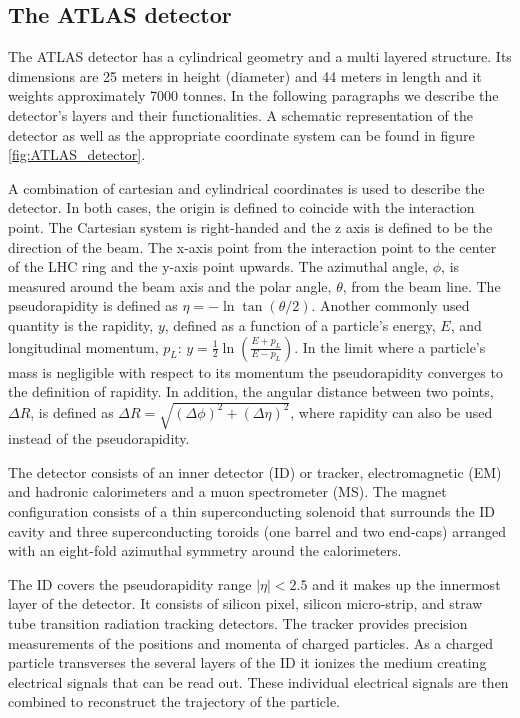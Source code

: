 \subsection{The ATLAS detector}
\label{section:ATLAS}

The ATLAS detector has a cylindrical geometry and a multi layered structure. Its dimensions are 25 meters in height (diameter) and 44 meters in length and it weights approximately 7000 tonnes. In the following paragraphs we describe the detector's layers and their functionalities. A schematic representation of the detector as well as the appropriate coordinate system can be found in figure \ref{fig:ATLAS_detector}.

A combination of cartesian and cylindrical coordinates is used to describe the detector. In both cases, the origin is defined to coincide with the interaction point. The Cartesian system is right-handed and the z axis is defined to be the direction of the beam. The x-axis point from the interaction point to the center of the LHC ring and the y-axis point upwards. The azimuthal angle, $\phi$, is measured around the beam axis and the polar angle, $\theta$, from the beam line. The pseudorapidity is defined as $\eta=-\ln \tan(\theta/2)$. Another commonly used quantity is the rapidity, $y$, defined as a function of a particle's energy, $E$, and longitudinal momentum, $p_L$: $y=\frac{1}{2}\ln \left(\frac{E+p_L}{E-p_L}\right)$. In the limit where a particle's mass is negligible with respect to its momentum the pseudorapidity converges to the definition of rapidity. In addition, the angular distance between two points, $\Delta R$, is defined as $\Delta R=\sqrt{(\Delta \phi)^2+(\Delta \eta)^2}$, where rapidity can also be used instead of the pseudorapidity. 

The detector consists of an inner detector (ID) or tracker, electromagnetic (EM) and hadronic calorimeters and a muon spectrometer (MS).
The magnet configuration consists of a thin superconducting solenoid that surrounds the ID cavity and three superconducting toroids (one barrel and two end-caps) arranged with an eight-fold azimuthal symmetry around the calorimeters.

The ID covers the pseudorapidity range $|\eta|<2.5$ and it makes up the innermost layer of the detector. It consists of silicon pixel, silicon micro-strip, and straw tube transition radiation tracking detectors. The tracker provides precision measurements of the positions and momenta of charged particles. As a charged particle transverses the several layers of the ID it ionizes the medium creating electrical signals that can be read out. These individual electrical signals are then combined to reconstruct the trajectory of the particle. 

